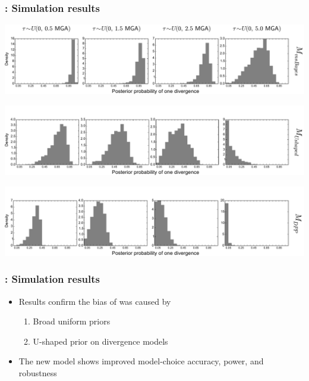 \begin{frame}
    \frametitle{\dppmsbayes: Simulation results}
        \centerline{
        \includegraphics[width=\textwidth]{../images/old_old_power_psi_prob.pdf}}
        \vspace{0mm}
        \centerline{
        \includegraphics[width=\textwidth]{../images/old_u-shaped_power_psi_prob_headless.pdf}}
        \vspace{0mm}
        \centerline{
        \includegraphics[width=\textwidth]{../images/old_dpp_power_psi_prob_headless.pdf}}
\end{frame}

\begin{frame}
    \frametitle{\dppmsbayes: Simulation results}
    \begin{itemize}
        \item Results confirm the bias of \msb was caused by

        \begin{enumerate}
            \item Broad uniform priors
            \item U-shaped prior on divergence models
        \end{enumerate}

        \item The new model shows improved model-choice accuracy, power, and
            robustness
    \end{itemize}
\end{frame}


